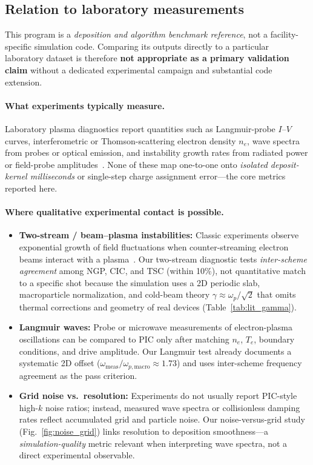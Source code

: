\subsection{Relation to laboratory measurements}
\label{sec:experimental}

This program is a \emph{deposition and algorithm benchmark reference}, not a facility-specific simulation code.
Comparing its outputs directly to a particular laboratory dataset is therefore \textbf{not appropriate as a primary validation claim} without a dedicated experimental campaign and substantial code extension.

\paragraph{What experiments typically measure.}
Laboratory plasma diagnostics report quantities such as Langmuir-probe $I$--$V$ curves, interferometric or Thomson-scattering electron density $n_e$, wave spectra from probes or optical emission, and instability growth rates from radiated power or field-probe amplitudes~\cite{malmberg1967,oneil1968}.
None of these map one-to-one onto \emph{isolated deposit-kernel milliseconds} or single-step charge assignment error---the core metrics reported here.

\paragraph{Where qualitative experimental contact is possible.}
\begin{itemize}
    \item \textbf{Two-stream / beam--plasma instabilities:} Classic experiments observe exponential growth of field fluctuations when counter-streaming electron beams interact with a plasma~\cite{malmberg1967}.
    Our two-stream diagnostic tests \emph{inter-scheme agreement} among NGP, CIC, and TSC (within 10\%), not quantitative match to a specific shot because the simulation uses a 2D periodic slab, macroparticle normalization, and cold-beam theory $\gamma \approx \omega_p/\sqrt{2}$ that omits thermal corrections and geometry of real devices (Table~\ref{tab:lit_gamma}).
    \item \textbf{Langmuir waves:} Probe or microwave measurements of electron-plasma oscillations can be compared to PIC only after matching $n_e$, $T_e$, boundary conditions, and drive amplitude.
    Our Langmuir test already documents a systematic 2D offset ($\omega_{\mathrm{meas}}/\omega_{p,\mathrm{macro}} \approx 1.73$) and uses inter-scheme frequency agreement as the pass criterion.
    \item \textbf{Grid noise vs.\ resolution:} Experiments do not usually report PIC-style high-$k$ noise ratios; instead, measured wave spectra or collisionless damping rates reflect accumulated grid and particle noise.
    Our noise-versus-grid study (Fig.~\ref{fig:noise_grid}) links resolution to deposition smoothness---a \emph{simulation-quality} metric relevant when interpreting wave spectra, not a direct experimental observable.
\end{itemize}

